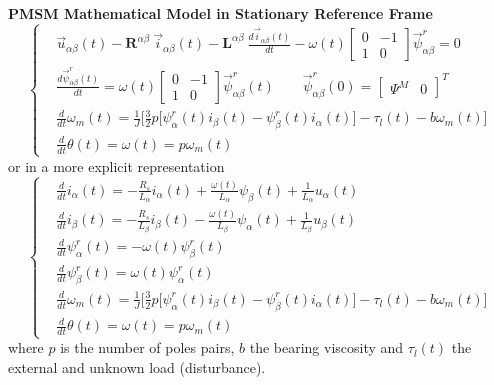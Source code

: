\documentclass[11pt,a4paper,oneside]{book}
\numberwithin{equation}{section}
\theoremstyle{it}
\theoremstyle{definition}
\begin{document}
\begin{mybox}
	\textbf{PMSM Mathematical Model in Stationary Reference Frame}
	\begin{equation}\label{pmsm_problem_1_eq_1}
		\left\lbrace \begin{aligned}
			& \vec{u}_{\alpha\beta}(t)-\mathbf{R}^{\alpha\beta}\ 
			\vec{i}_{\alpha\beta}(t)-\mathbf{L}^{\alpha\beta}\ 
			\frac{d\vec{i}_{\alpha\beta}(t)}{dt}-\omega(t) \begin{bmatrix} 
				0 & -1 \\ 1 & 0\end{bmatrix} \vec{\psi}^r_{\alpha\beta} = 0 
			\\[6pt]
			& \frac{d\vec{\psi}^r_{\alpha\beta}(t)}{dt} = \omega(t) 
			\begin{bmatrix} 0 & -1 \\ 1 & 0\end{bmatrix} 
			\vec{\psi}^r_{\alpha\beta}(t) \qquad 
			\vec{\psi}^r_{\alpha\beta}(0) = \begin{bmatrix} \Psi^M &  0 
			\end{bmatrix}^T \\[6pt]
			& \frac{d}{dt}{\omega}_m(t) = 
			\frac{1}{J}\Bigg[\frac{3}{2}p\Big[\psi^r_{\alpha}(t)i_{\beta}(t)-\psi^r_{\beta}(t)i_{\alpha}(t)\Big]
			-\tau_l(t) -b{\omega}_m(t)\Bigg]
			\\[6pt]
			& \frac{d}{dt}{\theta}(t) = \omega(t) = p\omega_m(t)
		\end{aligned} \right. 
	\end{equation}
	or in a more explicit representation
	\begin{equation}\label{pmsm_problem_1_eq_2}
		\left\lbrace \begin{aligned}
			& \frac{d}{dt} i_\alpha(t)= -\frac{R_s}{L_\alpha}i_\alpha(t) 
			+\frac{\omega(t)}{L_\alpha}\psi_\beta(t)+\frac{1}{L_\alpha}u_\alpha(t)
			\\[6pt]
			& \frac{d}{dt} i_\beta(t)= -\frac{R_s}{L_\beta}i_\beta(t) 
			-\frac{\omega(t)}{L_\beta}\psi_\alpha(t)+\frac{1}{L_\beta}u_\beta(t)
			\\[6pt]
			&\frac{d}{dt} \psi_\alpha^r(t) = -\omega(t)\psi_\beta^r(t) \\[6pt]
			&\frac{d}{dt} \psi_\beta^r(t) = \omega(t)\psi_\alpha^r(t) \\[6pt]
			& \frac{d}{dt}{\omega}_m(t) = 
			\frac{1}{J}\Bigg[\frac{3}{2}p\Big[\psi^r_{\alpha}(t)i_{\beta}(t)-\psi^r_{\beta}(t)i_{\alpha}(t)\Big]
			-\tau_l(t) -b{\omega}_m(t)\Bigg]
			\\[6pt]
			& \frac{d}{dt}{\theta}(t) = \omega(t) = p\omega_m(t)
		\end{aligned} \right. 
	\end{equation}
	where $p$ is the number of poles pairs, $b$ the bearing viscosity and 
	$\tau_l(t)$ the external and unknown load (disturbance).
\end{mybox}
\end{document}
